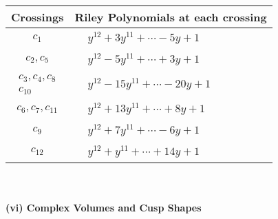 \documentclass[1p]{elsarticle_modified}
\theoremstyle{definition}
\begin{document}
\begin{tabular}{m{50pt}|m{274pt}}
Crossings & \hspace{64pt}Riley Polynomials at each crossing \\
\hline $$\begin{aligned}c_{1}\end{aligned}$$&$\begin{aligned}
&y^{12}+3 y^{11}+\cdots-5 y+1
\end{aligned}$\\
\hline $$\begin{aligned}c_{2},c_{5}\end{aligned}$$&$\begin{aligned}
&y^{12}-5 y^{11}+\cdots+3 y+1
\end{aligned}$\\
\hline $$\begin{aligned}c_{3},c_{4},c_{8}\\c_{10}\end{aligned}$$&$\begin{aligned}
&y^{12}-15 y^{11}+\cdots-20 y+1
\end{aligned}$\\
\hline $$\begin{aligned}c_{6},c_{7},c_{11}\end{aligned}$$&$\begin{aligned}
&y^{12}+13 y^{11}+\cdots+8 y+1
\end{aligned}$\\
\hline $$\begin{aligned}c_{9}\end{aligned}$$&$\begin{aligned}
&y^{12}+7 y^{11}+\cdots-6 y+1
\end{aligned}$\\
\hline $$\begin{aligned}c_{12}\end{aligned}$$&$\begin{aligned}
&y^{12}+y^{11}+\cdots+14 y+1
\end{aligned}$\\
\hline
\end{tabular}\\~\\
\newpage\flushleft \textbf{(vi) Complex Volumes and Cusp Shapes}
\end{document}
